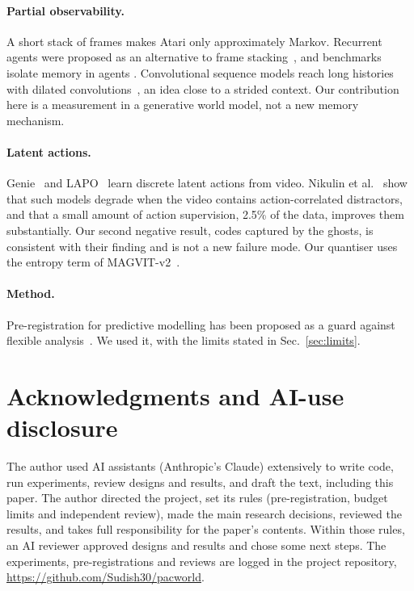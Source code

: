 \documentclass[11pt]{article}
\begin{document}
\paragraph{Partial observability.} A short stack of frames makes Atari only approximately Markov. Recurrent agents
were proposed as an alternative to frame stacking~\cite{hausknecht2015drqn}, and benchmarks isolate memory in agents
\cite{pasukonis2022memorymaze,morad2023popgym}. Convolutional sequence models reach long histories with dilated
convolutions~\cite{bai2018tcn}, an idea close to a strided context. Our contribution here is a measurement in a
generative world model, not a new memory mechanism.

\paragraph{Latent actions.} Genie~\cite{bruce2024genie} and LAPO~\cite{schmidt2023lapo} learn discrete latent
actions from video. Nikulin et al.~\cite{nikulin2025latent} show that such models degrade when the video contains
action-correlated distractors, and that a small amount of action supervision, 2.5\% of the data, improves them
substantially. Our second negative result, codes captured by the ghosts, is consistent with their finding and is not
a new failure mode. Our quantiser uses the entropy term of MAGVIT-v2~\cite{yu2024magvit2}.

\paragraph{Method.} Pre-registration for predictive modelling has been proposed as a guard against flexible
analysis~\cite{hofman2023preregistration}. We used it, with the limits stated in Sec.~\ref{sec:limits}.

\section*{Acknowledgments and AI-use disclosure}
The author used AI assistants (Anthropic's Claude) extensively to write code, run experiments, review designs and
results, and draft the text, including this paper. The author directed the project, set its rules
(pre-registration, budget limits and independent review), made the main research decisions, reviewed the results,
and takes full responsibility for the paper's contents. Within those rules, an AI reviewer approved designs and
results and chose some next steps. The experiments, pre-registrations and reviews are logged in the project
repository, \url{https://github.com/Sudish30/pacworld}.
\end{document}

